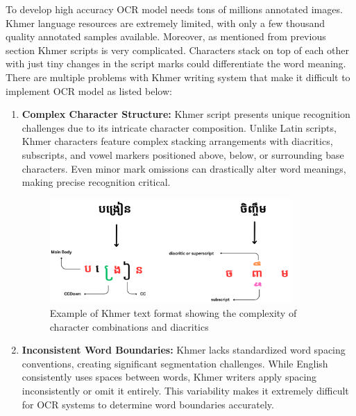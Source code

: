 To develop high accuracy OCR model needs tons of millions 
annotated images. Khmer language resources are extremely 
limited, with only a few thousand quality annotated samples 
available. Moreover, as mentioned from previous section 
Khmer scripts is very complicated. Characters stack on 
top of each other with just tiny changes in the script 
marks could differentiate the word meaning. There are 
multiple problems with Khmer writing system that make it 
difficult to implement OCR model as listed below:

\begin{enumerate}
    \item \textbf{Complex Character Structure:} Khmer script presents unique recognition challenges due to its intricate character composition. Unlike Latin scripts, Khmer characters feature complex stacking arrangements with diacritics, subscripts, and vowel markers positioned above, below, or surrounding base characters. Even minor mark omissions can drastically alter word meanings, making precise recognition critical.
    
        \begin{figure}[H]
            \centering
            \includegraphics[width=0.87\textwidth]{figures/example_of_text_format.png}
            \begin{minipage}{0.87\textwidth}
                \caption{Example of Khmer text format showing the complexity of character combinations and diacritics}
                \label{fig:text_format}
            \end{minipage}
        \end{figure}
 
    \item \textbf{Inconsistent Word Boundaries:} Khmer lacks standardized word spacing conventions, creating significant segmentation challenges. While English consistently uses spaces between words, Khmer writers apply spacing inconsistently or omit it entirely. This variability makes it extremely difficult for OCR systems to determine word boundaries accurately.
    

\end{enumerate}

